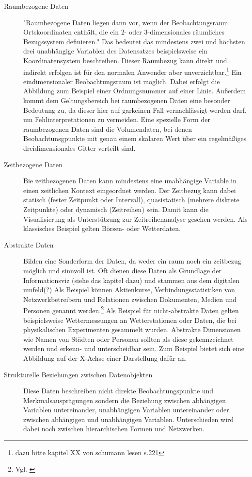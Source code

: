 \documentclass[a4paper, 12pt, DIVcalc, onepage, pdftex, headsepline, footsepline]{scrreprt}
\begin{document}
\begin{description}
\item[Raumbezogene Daten]
"Raumbezogene Daten liegen dann vor, wenn der Beobachtungsraum Ortskoordinaten enthält,
die ein 2- oder 3-dimensionales räumliches Bezugssystem definieren."\citep[S.\,219]{Schumann}
Das bedeutet das mindestens zwei und höchsten drei unabhängige Variablen des Datensatzes beispielsweise
ein Koordinatensystem beschreiben. Dieser Raumbezug kann direkt und indirekt erfolgen ist für
den normalen Anwender aber unverzichtbar.\footnote{dazu bitte kapitel XX von schumann lesen s.221}
Ein eindimensionaler Beobachtungsraum ist möglich. Dabei erfolgt die Abbildung zum Beispiel einer
Ordnungsnummer auf einer Linie. Außerdem kommt dem Geltungsbereich bei raumbezogenen Daten eine
besonder Bedeutung zu, da dieser hier auf garkeinen Fall vernachlässigt werden darf,
um Fehlinterpretationen zu vermeiden.
Eine spezielle Form der raumbezogenen Daten sind die Volumendaten, bei denen Beobachtunsgpunkte mit
genau einem skalaren Wert über ein regelmäßiges dreidimensionales Gitter verteilt sind.
\item[Zeitbezogene Daten]
Bie zeitbezogenen Daten kann mindestens eine unabhängige Variable in einen zeitlichen Kontext eingeordnet werden.
Der Zeitbezug kann dabei statisch (fester Zeitpunkt oder Intervall), quasistatisch (mehrere diskrete Zeitpunkte)
oder dynamisch (Zeitreihen) sein. Damit kann die Visualisierung als Unterstützung zur
Zeitreihenanalyse gesehen werden.
Als klassisches Beispiel gelten Börsen- oder Wetterdaten.
\item[Abstrakte Daten]
Bilden eine Sonderform der Daten, da weder ein raum noch ein zeitbezug möglich und sinnvoll ist. Oft dienen diese
Daten als Grundlage der Informationsviz (siehe das kapitel dazu) und stammen aus dem digitalen umfeld(?)
Als Beispiel können Aktienkurse, Verbindungsstatistiken von Netzwerkbetreibern und Relationen zwischen
Dokumenten, Medien und Personen genannt werden.\footnote{Vgl. \citep{Preim}} Als Beispiel für nicht-abstrakte
Daten gelten beispielsweise Wettermessungen an Wetterstationen oder Daten, die bei physikalischen Experimenten
gesammelt wurden. Abstrakte Dimensionen wie Namen von Städten oder Personen sollten als diese gekennzeichnet
werden und erkenn- und unterscheidbar sein. Zum Beispiel bietet sich eine Abbildung auf der X-Achse einer
Darstellung dafür an.
\item[Strukturelle Beziehungen zwischen Datenobjekten]
Diese Daten beschreiben nicht direkte Beobachtungspunkte und Merkmalsausprägungen sondern die Beziehung zwischen
abhängigen Variablen untereinander, unabhängigen Variablen untereinander oder zwischen abhängigen und unabhängigen
Variablen.
Unterschieden wird dabei noch zwischen hierarchischen Formen und Netzwerken. 
\end{description}
\end{document}
